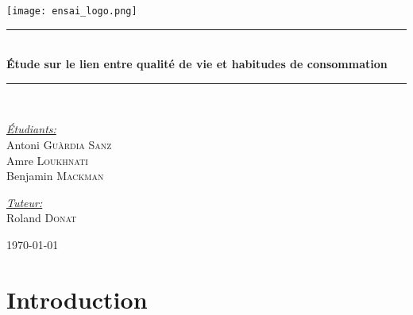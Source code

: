 \documentclass{article}
\begin{document}
\normalsize

\begin{titlepage}
\begin{center}
\texttt{[image: ensai\_logo.png]}\\[2.0 cm] 



\rule{\linewidth}{0.4mm}
\\[0.4cm]{\Large\bfseries \Large{Étude sur le lien entre qualité de vie et habitudes de consommation}}\\[0.2cm]
\rule{\linewidth}{0.4mm}\\[3cm]


\begin{flushleft} \large
\emph{\underline{Étudiants:}}\\\vspace{0.2cm}
Antoni \textsc{Guàrdia Sanz} \\
Amre \textsc{Loukhnati} \\
Benjamin \textsc{ Mackman}\\
\end{flushleft}

\begin{flushright} \large
\emph{\underline{Tuteur:}} \\ \vspace{0.2cm}
Roland \textsc{Donat} \\ \vspace{0.6cm}
\end{flushright}

\vfill
{\large \today}
\end{center}
\end{titlepage}

\onehalfspacing






\newpage
\tableofcontents 
\newpage
\section{Introduction}
\end{document}
